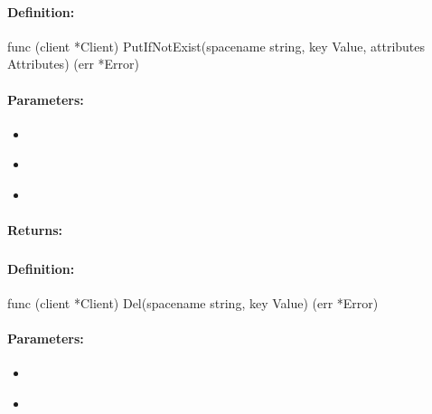 \paragraph{Definition:}
\begin{gocode}
func (client *Client) PutIfNotExist(spacename string, key Value, attributes Attributes) (err *Error)
\end{gocode}

\paragraph{Parameters:}
\begin{itemize}[noitemsep]
\item {}\\

\item {}\\

\item {}\\

\end{itemize}

\paragraph{Returns:}


\pagebreak
\subsubsection{}
\label{api:Go:Del}


\paragraph{Definition:}
\begin{gocode}
func (client *Client) Del(spacename string, key Value) (err *Error)
\end{gocode}

\paragraph{Parameters:}
\begin{itemize}[noitemsep]
\item {}\\

\item {}\\

\end{itemize}

